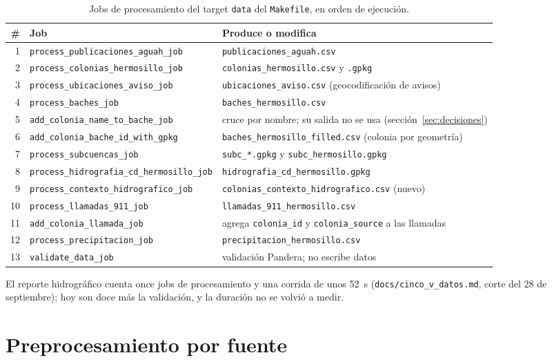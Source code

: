 \documentclass[11pt]{article}
\newcommand{\cod}[1]{\nolinkurl{#1}}
\begin{document}
\begin{table}[!htbp]
  \centering
  \footnotesize
  \caption{Jobs de procesamiento del target \texttt{data} del \cod{Makefile}, en orden de ejecución.}
  \label{tab:jobs}
  \begin{tabularx}{\textwidth}{r L{5.6cm} Y}
    \toprule
    \# & Job & Produce o modifica \\
     & \cod{process_publicaciones_aguah_job} & \cod{publicaciones_aguah.csv} \\
    2 & \cod{process_colonias_hermosillo_job} & \cod{colonias_hermosillo.csv} y \cod{.gpkg} \\
    3 & \cod{process_ubicaciones_aviso_job} & \cod{ubicaciones_aviso.csv} (geocodificación de avisos) \\
    4 & \cod{process_baches_job} & \cod{baches_hermosillo.csv} \\
    5 & \cod{add_colonia_name_to_bache_job} & cruce por nombre; su salida no se usa (sección~\ref{sec:decisiones}) \\
    6 & \cod{add_colonia_bache_id_with_gpkg} & \cod{baches_hermosillo_filled.csv} (colonia por geometría) \\
    7 & \cod{process_subcuencas_job} & \cod{subc_*.gpkg} y \cod{subc_hermosillo.gpkg} \\
    8 & \cod{process_hidrografia_cd_hermosillo_job} & \cod{hidrografia_cd_hermosillo.gpkg} \\
    9 & \cod{process_contexto_hidrografico_job} & \cod{colonias_contexto_hidrografico.csv} (nuevo) \\
    10 & \cod{process_llamadas_911_job} & \cod{llamadas_911_hermosillo.csv} \\
    11 & \cod{add_colonia_llamada_job} & agrega \cod{colonia_id} y \cod{colonia_source} a las llamadas \\
    12 & \cod{process_precipitacion_job} & \cod{precipitacion_hermosillo.csv} \\
    13 & \cod{validate_data_job} & validación Pandera; no escribe datos \\
    \bottomrule
  \end{tabularx}
\end{table}

El reporte hidrográfico cuenta once jobs de procesamiento y una corrida de unos 52~s (\cod{docs/cinco_v_datos.md}, corte del 28 de septiembre); hoy son doce más la validación, y la duración no se volvió a medir.

\section{Preprocesamiento por fuente}
\label{sec:prep}
\end{document}
